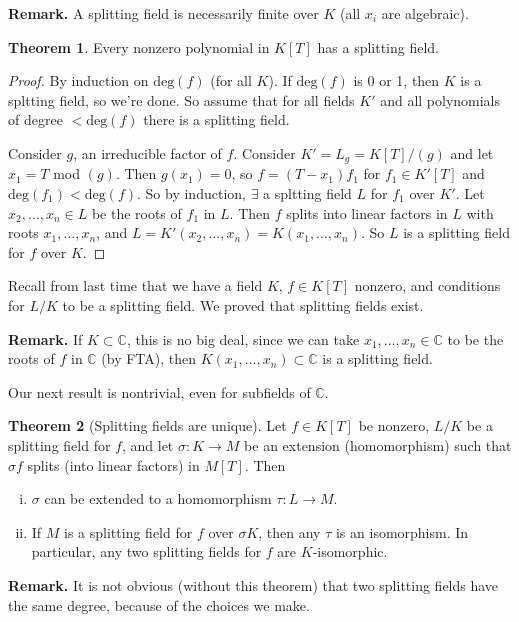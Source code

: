 \documentclass{article}
\theoremstyle{definition}
\newtheorem{theorem}{Theorem}[section]
\begin{document}
\textbf{Remark.} A splitting field is necessarily finite over $K$ (all $x_i$ are algebraic).
\begin{theorem}\label{6.6}
    Every nonzero polynomial in $K[T]$ has a splitting field.
\end{theorem}
\begin{proof}
    By induction on $\text{deg}(f)$ (for all $K$). If $\text{deg}(f)$ is 0 or 1, then $K$ is a spltting field, so we're done. So assume that for all fields $K'$ and all polynomials of degree $<\text{deg}(f)$ there is a splitting field.
    \vspace{1mm}
    
    Consider $g$, an irreducible factor of $f$. Consider $K' = L_g = K[T]/(g)$ and let $x_1 = T$ mod $(g)$. Then $g(x_1)=0$, so $f = (T-x_1)f_1$ for $f_1 \in K'[T]$ and $\text{deg}(f_1)<\text{deg}(f)$. So by induction, $\exists$ a spltting field $L$ for $f_1$ over $K'$. Let $x_2,\ldots,x_n \in L$ be the roots of $f_1$ in $L$. Then $f$ splits into linear factors in $L$ with roots $x_1,\ldots,x_n$, and $L=K'(x_2,\ldots,x_n) = K(x_1,\ldots,x_n)$. So $L$ is a splitting field for $f$ over $K$.
\end{proof}

Recall from last time that we have a field $K$, $f \in K[T]$ nonzero, and conditions for $L/K$ to be a splitting field. We proved that splitting fields exist. 
\vspace{1mm}

\textbf{Remark.} If $K \subset \mathbb{C}$, this is no big deal, since we can take $x_1,\ldots,x_n \in \mathbb{C}$ to be the roots of $f$ in $\mathbb{C}$ (by FTA), then $K(x_1,\ldots,x_n) \subset \mathbb{C}$ is a splitting field.
\vspace{1mm}

Our next result is nontrivial, even for subfields of $\mathbb{C}$.
\begin{theorem}[Splitting fields are unique]
    Let $f \in K[T]$ be nonzero, $L/K$ be a splitting field for $f$, and let $\sigma : K \to M$ be an extension (homomorphism) such that $\sigma f$ splits (into linear factors) in $M[T]$. Then
    \begin{enumerate}[(i)]
        \item $\sigma$ can be extended to a homomorphism $\tau : L \to M$.
        \item If $M$ is a splitting field for $f$ over $\sigma K$, then any $\tau$ is an isomorphism. In particular, any two splitting fields for $f$ are $K$-isomorphic.
    \end{enumerate}
\end{theorem}
\textbf{Remark.} It is not obvious (without this theorem) that two splitting fields have the same degree, because of the choices we make.
\end{document}
